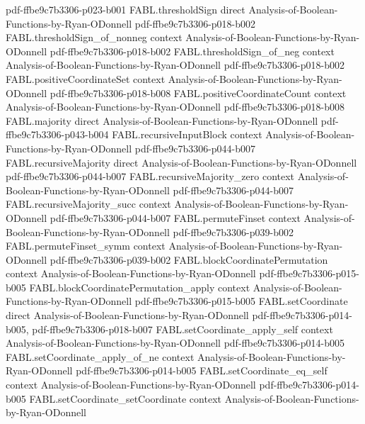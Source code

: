 \begin{theorem}
  {pdf-ffbe9c7b3306-p023-b001}
\proofstep
  {FABL.thresholdSign}
  {direct}
  {Analysis-of-Boolean-Functions-by-Ryan-ODonnell}
  {pdf-ffbe9c7b3306-p018-b002}
\proofstep
  {FABL.thresholdSign_of_nonneg}
  {context}
  {Analysis-of-Boolean-Functions-by-Ryan-ODonnell}
  {pdf-ffbe9c7b3306-p018-b002}
\proofstep
  {FABL.thresholdSign_of_neg}
  {context}
  {Analysis-of-Boolean-Functions-by-Ryan-ODonnell}
  {pdf-ffbe9c7b3306-p018-b002}
\proofstep
  {FABL.positiveCoordinateSet}
  {context}
  {Analysis-of-Boolean-Functions-by-Ryan-ODonnell}
  {pdf-ffbe9c7b3306-p018-b008}
\proofstep
  {FABL.positiveCoordinateCount}
  {context}
  {Analysis-of-Boolean-Functions-by-Ryan-ODonnell}
  {pdf-ffbe9c7b3306-p018-b008}
\proofstep
  {FABL.majority}
  {direct}
  {Analysis-of-Boolean-Functions-by-Ryan-ODonnell}
  {pdf-ffbe9c7b3306-p043-b004}
\proofstep
  {FABL.recursiveInputBlock}
  {context}
  {Analysis-of-Boolean-Functions-by-Ryan-ODonnell}
  {pdf-ffbe9c7b3306-p044-b007}
\proofstep
  {FABL.recursiveMajority}
  {direct}
  {Analysis-of-Boolean-Functions-by-Ryan-ODonnell}
  {pdf-ffbe9c7b3306-p044-b007}
\proofstep
  {FABL.recursiveMajority_zero}
  {context}
  {Analysis-of-Boolean-Functions-by-Ryan-ODonnell}
  {pdf-ffbe9c7b3306-p044-b007}
\proofstep
  {FABL.recursiveMajority_succ}
  {context}
  {Analysis-of-Boolean-Functions-by-Ryan-ODonnell}
  {pdf-ffbe9c7b3306-p044-b007}
\proofstep
  {FABL.permuteFinset}
  {context}
  {Analysis-of-Boolean-Functions-by-Ryan-ODonnell}
  {pdf-ffbe9c7b3306-p039-b002}
\proofstep
  {FABL.permuteFinset_symm}
  {context}
  {Analysis-of-Boolean-Functions-by-Ryan-ODonnell}
  {pdf-ffbe9c7b3306-p039-b002}
\proofstep
  {FABL.blockCoordinatePermutation}
  {context}
  {Analysis-of-Boolean-Functions-by-Ryan-ODonnell}
  {pdf-ffbe9c7b3306-p015-b005}
\proofstep
  {FABL.blockCoordinatePermutation_apply}
  {context}
  {Analysis-of-Boolean-Functions-by-Ryan-ODonnell}
  {pdf-ffbe9c7b3306-p015-b005}
\proofstep
  {FABL.setCoordinate}
  {direct}
  {Analysis-of-Boolean-Functions-by-Ryan-ODonnell}
  {pdf-ffbe9c7b3306-p014-b005,
    pdf-ffbe9c7b3306-p018-b007}
\proofstep
  {FABL.setCoordinate_apply_self}
  {context}
  {Analysis-of-Boolean-Functions-by-Ryan-ODonnell}
  {pdf-ffbe9c7b3306-p014-b005}
\proofstep
  {FABL.setCoordinate_apply_of_ne}
  {context}
  {Analysis-of-Boolean-Functions-by-Ryan-ODonnell}
  {pdf-ffbe9c7b3306-p014-b005}
\proofstep
  {FABL.setCoordinate_eq_self}
  {context}
  {Analysis-of-Boolean-Functions-by-Ryan-ODonnell}
  {pdf-ffbe9c7b3306-p014-b005}
\proofstep
  {FABL.setCoordinate_setCoordinate}
  {context}
  {Analysis-of-Boolean-Functions-by-Ryan-ODonnell}

\end{theorem}

